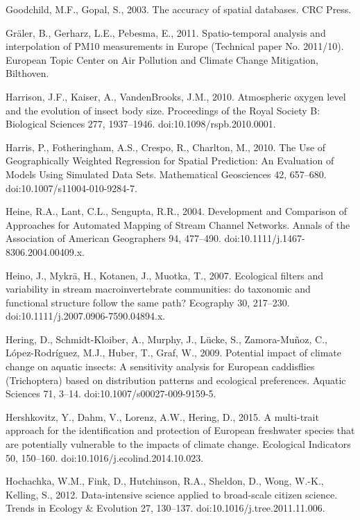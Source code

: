 \begin{thebibliography}
\bibitem{} \hangindent=1cm Goodchild, M.F., Gopal, S., 2003. The accuracy of spatial databases. CRC Press.

\bibitem{} \hangindent=1cm Gräler, B., Gerharz, L.E., Pebesma, E., 2011. Spatio-temporal analysis and interpolation of PM10 measurements in Europe (Technical paper No. 2011/10). European Topic Center on Air Pollution and Climate Change Mitigation, Bilthoven.

\bibitem{} \hangindent=1cm Harrison, J.F., Kaiser, A., VandenBrooks, J.M., 2010. Atmospheric oxygen level and the evolution of insect body size. Proceedings of the Royal Society B: Biological Sciences 277, 1937–1946. doi:10.1098/rspb.2010.0001.

\bibitem{} \hangindent=1cm Harris, P., Fotheringham, A.S., Crespo, R., Charlton, M., 2010. The Use of Geographically Weighted Regression for Spatial Prediction: An Evaluation of Models Using Simulated Data Sets. Mathematical Geosciences 42, 657–680. doi:10.1007/s11004-010-9284-7.

\bibitem{} \hangindent=1cm Heine, R.A., Lant, C.L., Sengupta, R.R., 2004. Development and Comparison of Approaches for Automated Mapping of Stream Channel Networks. Annals of the Association of American Geographers 94, 477–490. doi:10.1111/j.1467-8306.2004.00409.x.

\bibitem{} \hangindent=1cm Heino, J., Mykrä, H., Kotanen, J., Muotka, T., 2007. Ecological filters and variability in stream macroinvertebrate communities: do taxonomic and functional structure follow the same path? Ecography 30, 217–230. doi:10.1111/j.2007.0906-7590.04894.x.

\bibitem{} \hangindent=1cm Hering, D., Schmidt-Kloiber, A., Murphy, J., Lücke, S., Zamora-Muñoz, C., López-Rodríguez, M.J., Huber, T., Graf, W., 2009. Potential impact of climate change on aquatic insects: A sensitivity analysis for European caddisflies (Trichoptera) based on distribution patterns and ecological preferences. Aquatic Sciences 71, 3–14. doi:10.1007/s00027-009-9159-5.

\bibitem{} \hangindent=1cm Hershkovitz, Y., Dahm, V., Lorenz, A.W., Hering, D., 2015. A multi-trait approach for the identification and protection of European freshwater species that are potentially vulnerable to the impacts of climate change. Ecological Indicators 50, 150–160. doi:10.1016/j.ecolind.2014.10.023.

\bibitem{} \hangindent=1cm Hochachka, W.M., Fink, D., Hutchinson, R.A., Sheldon, D., Wong, W.-K., Kelling, S., 2012. Data-intensive science applied to broad-scale citizen science. Trends in Ecology & Evolution 27, 130–137. doi:10.1016/j.tree.2011.11.006.


\end{thebibliography}

